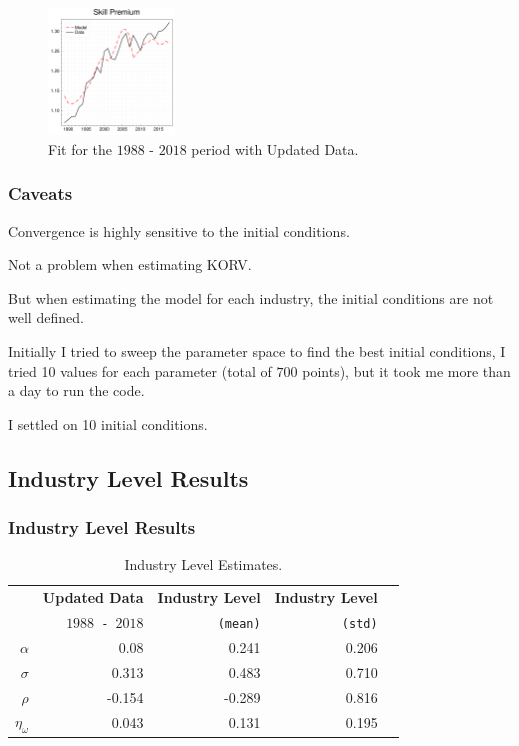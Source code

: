 \documentclass[notes,11pt, aspectratio=169]{beamer}
\newenvironment{wideitemize}{\itemize\addtolength{\itemsep}{10pt}}{\enditemize}
\begin{document}
\begin{frame}
{\begin{figure}[H]
 \hfill
 \includegraphics[width=0.3\textwidth]{../images/fig:updated_ind_estimation_sp_slides.pdf}
 \caption{\label{fig:korv_estimation_extended_industry} Fit for the $1988$ - $2018$ period with Updated Data.}
 \end{figure}
 }
\end{frame}

\begin{frame}
 \frametitle{Caveats}
 \begin{wideitemize}
 \item Convergence is highly sensitive to the initial conditions.
 \begin{wideitemize}
 \item Not a problem when estimating KORV.
 \item But when estimating the model for each industry, the initial conditions are not well defined.
 \end{wideitemize}
 \item Initially I tried to sweep the parameter space to find the best initial conditions, I tried 10 values for each parameter (total of $700$ points), but it took me more than a day to run the code.
 \item I settled on 10 initial conditions.
 \end{wideitemize}
\end{frame}



\subsection{Industry Level Results}
\begin{frame}
 \frametitle{Industry Level Results}
 \begin{table}[h]
 \begin{center}
 \begin{tabular}{rrrrr}
 \hline\hline
 & \textbf{Updated Data} & \textbf{Industry Level} & \textbf{Industry Level} \\
 & \texttt{$1988$ - $2018$} & \texttt{(mean)} & \texttt{(std)} \\\hline
 $\alpha$ & 0.08 & 0.241 & 0.206 \\
 $\sigma$ & 0.313 & 0.483 & 0.710\\
 $\rho$ & -0.154 & -0.289 & 0.816\\
 $\eta_\omega$& 0.043 & 0.131 & 0.195\\\hline\hline
\end{tabular}
\end{center}
\caption{\label{tab:estimation_ind} Industry Level Estimates.}
\end{table}

\end{frame}
\end{document}
